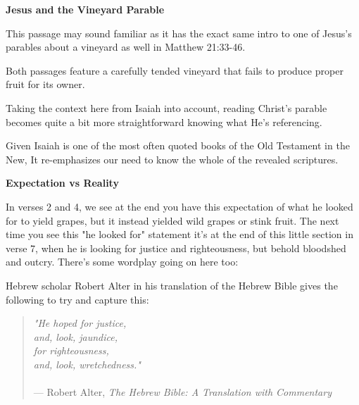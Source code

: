 \documentclass[11pt]{article}
\begin{document}
\vspace{3em}
{\large\bfseries Jesus and the Vineyard Parable}
\vspace{1em}

This passage may sound familiar as it has the exact same intro to one of Jesus's parables about a vineyard as well in Matthew 21:33-46.

Both passages feature a carefully tended vineyard that fails to produce proper fruit for its owner.

\vspace{1em}

Taking the context here from Isaiah into account, reading Christ's parable becomes quite a bit more straightforward knowing what He's referencing.

Given Isaiah is one of the most often quoted books of the Old Testament in the New, It re-emphasizes our need to know the whole of the revealed scriptures. 

\vspace{3em}
{\large\bfseries Expectation vs Reality}
\vspace{1em}


In verses 2 and 4, we see at the end you have this expectation of what he looked for to yield grapes, but it instead yielded wild grapes or stink fruit. The next time you see this "he looked for" statement it's at the end of this little section in verse 7, when he is looking for justice and righteousness, but behold bloodshed and outcry. There's some wordplay going on here too:



Hebrew scholar Robert Alter in his translation of the Hebrew Bible gives the following to try and capture this:

\begin{quote}
\textit{"He hoped for justice,\\ and, look, jaundice,\\ for righteousness,\\ and, look, wretchedness."}\\\\
\hfill --- Robert Alter, \textit{The Hebrew Bible: A Translation with Commentary}
\end{quote}
\end{document}
